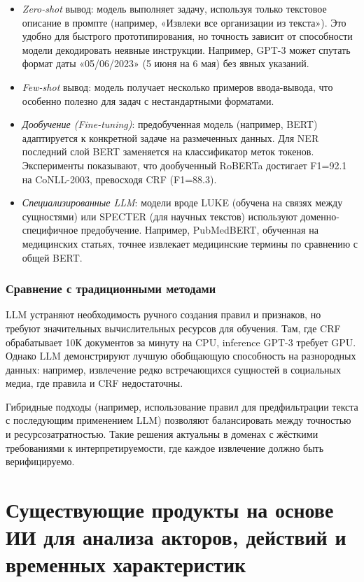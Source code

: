 \begin{itemize}
    \item \textit{Zero-shot} вывод: модель выполняет задачу, используя только текстовое описание в промпте (например, «Извлеки все организации из текста»). Это удобно для быстрого прототипирования, но точность зависит от способности модели декодировать неявные инструкции. Например, GPT-3 может спутать формат даты «05/06/2023» (5 июня на 6 мая) без явных указаний.

    \item \textit{Few-shot} вывод: модель получает несколько примеров ввода-вывода, что особенно полезно для задач с нестандартными форматами.
    
    \item \textit{Дообучение (Fine-tuning)}: предобученная модель (например, BERT) адаптируется к конкретной задаче на размеченных данных. Для NER последний слой BERT заменяется на классификатор меток токенов. Эксперименты показывают, что дообученный RoBERTa достигает F1=92.1 на CoNLL-2003, превосходя CRF (F1=88.3).

    \item \textit{Специализированные LLM}: модели вроде LUKE (обучена на связях между сущностями) или SPECTER (для научных текстов) используют доменно-специфичное предобучение. Например, PubMedBERT, обученная на медицинских статьях, точнее извлекает медицинские термины по сравнению с общей BERT.
\end{itemize}

\subsubsection{Сравнение с традиционными методами}

LLM устраняют необходимость ручного создания правил и признаков, но требуют значительных вычислительных ресурсов для обучения. Там, где CRF обрабатывает 10К документов за минуту на CPU, inference GPT-3 требует GPU. Однако LLM демонстрируют лучшую обобщающую способность на разнородных данных: например, извлечение редко встречающихся сущностей в социальных медиа, где правила и CRF недостаточны.

Гибридные подходы (например, использование правил для предфильтрации текста с последующим применением LLM) позволяют балансировать между точностью и ресурсозатратностью. Такие решения актуальны в доменах с жёсткими требованиями к интерпретируемости, где каждое извлечение должно быть верифицируемо.

\section{Существующие продукты на основе ИИ для анализа акторов, действий и временных характеристик}

